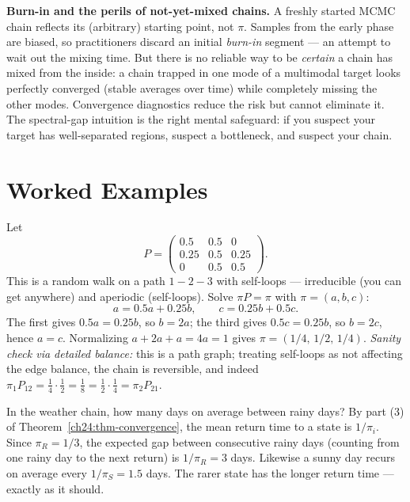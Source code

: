 \begin{trapbox}
\textbf{Burn-in and the perils of not-yet-mixed chains.} A freshly started MCMC
chain reflects its (arbitrary) starting point, not $\pi$. Samples from the early
phase are biased, so practitioners discard an initial \emph{burn-in} segment ---
an attempt to wait out the mixing time. But there is no reliable way to be
\emph{certain} a chain has mixed from the inside: a chain trapped in one mode of a
multimodal target looks perfectly converged (stable averages over time) while
completely missing the other modes. Convergence diagnostics reduce the risk but
cannot eliminate it. The spectral-gap intuition is the right mental safeguard: if
you suspect your target has well-separated regions, suspect a bottleneck, and
suspect your chain.
\end{trapbox}

\section{Worked Examples}
\label{ch24:worked}

\begin{example}
\label{ch24:ex-3x3}
Let
\[
  P = \begin{pmatrix}
    0.5 & 0.5 & 0 \\
    0.25 & 0.5 & 0.25 \\
    0 & 0.5 & 0.5
  \end{pmatrix}.
\]
This is a random walk on a path $1 - 2 - 3$ with self-loops --- irreducible
(you can get anywhere) and aperiodic (self-loops). Solve $\pi P = \pi$ with
$\pi = (a,b,c)$:
\[
  a = 0.5a + 0.25b,\qquad c = 0.25b + 0.5c .
\]
The first gives $0.5a = 0.25b$, so $b = 2a$; the third gives $0.5c = 0.25b$, so
$b = 2c$, hence $a = c$. Normalizing $a + 2a + a = 4a = 1$ gives
$\pi = (1/4,\,1/2,\,1/4)$. \emph{Sanity check via detailed balance:} this is a
path graph; treating self-loops as not affecting the edge balance, the chain is
reversible, and indeed $\pi_1 P_{12} = \tfrac14\cdot\tfrac12 = \tfrac18 =
\tfrac12\cdot\tfrac14 = \pi_2 P_{21}$. \checkmark
\end{example}

\begin{example}
\label{ch24:ex-return-time}
In the weather chain, how many days on average between rainy days? By part (3) of
Theorem~\ref{ch24:thm-convergence}, the mean return time to a state is
$1/\pi_i$. Since $\pi_R = 1/3$, the expected gap between consecutive rainy days
(counting from one rainy day to the next return) is $1/\pi_R = 3$ days. Likewise a
sunny day recurs on average every $1/\pi_S = 1.5$ days. The rarer state has the
longer return time --- exactly as it should.
\end{example}

